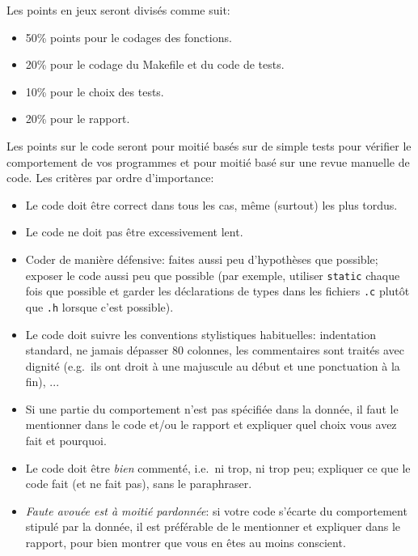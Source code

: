 \documentclass{article}
\begin{document}
Les points en jeux seront divisés comme suit:
\begin{itemize}
\item 50\% points pour le codages des fonctions.
\item 20\% pour le codage du Makefile et du code de tests.
\item 10\% pour le choix des tests.
\item 20\% pour le rapport.
\end{itemize}
Les points sur le code seront pour moitié basés sur de simple tests pour
vérifier le comportement de vos programmes et pour moitié basé sur une revue
manuelle de code.  Les critères par ordre d'importance:
\begin{itemize}
\item Le code doit être correct dans tous les cas, même (surtout) les
  plus tordus.
\item Le code ne doit pas être excessivement lent.
\item Coder de manière défensive: faites aussi peu d'hypothèses que
  possible; exposer le code aussi peu que possible (par exemple, utiliser
  \texttt{static} chaque fois que possible et garder les déclarations de
  types dans les fichiers \texttt{.c} plutôt que \texttt{.h} lorsque c'est
  possible).
\item Le code doit suivre les conventions stylistiques habituelles:
  indentation standard, ne jamais dépasser 80 colonnes, les commentaires
  sont traités avec dignité (e.g.~ils ont droit à une majuscule au début et
  une ponctuation à la fin), ...
\item Si une partie du comportement n'est pas spécifiée dans la donnée, il
  faut le mentionner dans le code et/ou le rapport et expliquer quel choix
  vous avez fait et pourquoi.
\item Le code doit être \emph{bien} commenté, i.e.~ni trop, ni trop peu;
  expliquer ce que le code fait (et ne fait pas), sans le paraphraser.
\item \emph{Faute avouée est à moitié pardonnée}: si votre code s'écarte du
  comportement stipulé par la donnée, il est préférable de le mentionner
  et expliquer dans le rapport, pour bien montrer que vous en êtes au
  moins conscient.
\end{itemize}
\end{document}
